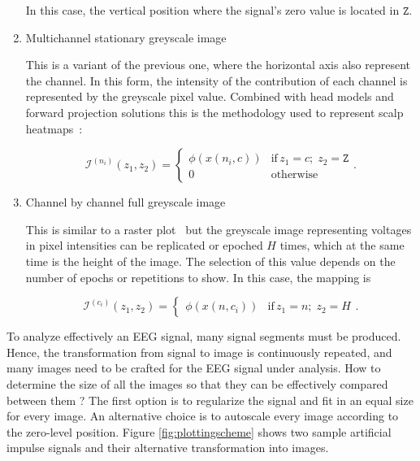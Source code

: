 \begin{enumerate}
In this case, the vertical position where the signal's zero value is located in $\mathtt{Z}$.

\item Multichannel stationary greyscale image

This is a variant of the previous one, where the horizontal axis also represent the channel.   In this form, the intensity of the contribution of each channel is represented by the greyscale pixel value.  Combined with head models and forward projection solutions this is the methodology used to represent scalp heatmaps~\cite{Gramfort2013}:

\begin{equation}
\mathcal{I}^{(n_i)}(z_1,z_2)= \left\{ \begin{array}{rl}
\phi(x(n_i,c)) & \text{if} \,  z_1 = c; \; z_2 =  \mathtt{Z} \\
0   & \mbox{otherwise}
\end{array}\right ..
\label{eq:image5}
\end{equation}


\item Channel by channel full greyscale image

This is similar to a raster plot~\cite{Cohen2014} but the greyscale image representing voltages in pixel intensities can be replicated or epoched $H$ times, which at the same time is the height of the image.  The selection of this value depends on the number of epochs or repetitions to show.  In this case, the mapping is

\begin{equation}
\mathcal{I}^{(c_i)}(z_1,z_2) = \left\{ \begin{array}{rl} \phi(x(n,c_i))  & \text{if} \,  z_1 = n; \; z_2 = H \end{array}\right. .
\label{eq:image6}
\end{equation}


\end{enumerate}


To analyze effectively an EEG signal, many signal segments must be produced.  Hence, the transformation from signal to image is continuously repeated, and many images need to be crafted for the EEG signal under analysis.  How to determine the size of all the images so that they can be effectively compared between them ?  The first option is to regularize the signal and fit in an equal size for every image.  An alternative choice is to autoscale every image according to the zero-level position.  Figure \ref{fig:plottingscheme} shows two sample artificial impulse signals and their  alternative transformation into images.

